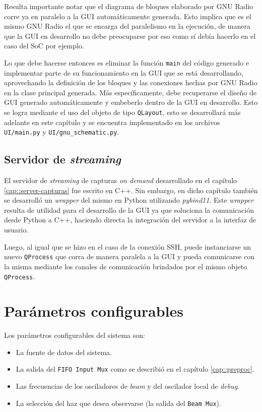 \documentclass[../../main.tex]{subfiles}
\begin{document}
Resulta importante notar que el diagrama de bloques elaborado por GNU Radio corre ya en paralelo a la GUI automáticamente generada. Esto implica que es el mismo GNU Radio el que se encarga del paralelismo en la ejecución, de manera que la GUI en desarrollo no debe preocuparse por eso como sí debía hacerlo en el caso del SoC por ejemplo.

Lo que debe hacerse entonces es eliminar la función \texttt{main} del código generado e implementar parte de su funcionamiento en la GUI que se está desarrollando, aprovechando la definición de los bloques y las conexiones hechas por GNU Radio en la clase principal generada. 
Más específicamente, debe recuperarse el diseño de GUI generado automáticamente y embeberlo dentro de la GUI en desarrollo. Esto se logra mediante el uso del objeto de tipo \texttt{QLayout}, esto se desarrollará más adelante en este capítulo y se encuentra implementado en los archivos \texttt{UI/main.py} y \texttt{UI/gnu\_schematic.py}.

\subsection{Servidor de \textit{streaming}}
El servidor de \textit{streaming} de capturas \textit{on demand} desarrollado en el capítulo \ref{cap::server-capturas} fue escrito en C++. Sin embargo, en dicho capítulo también se desarrolló un \textit{wrapper} del mismo en Python utilizando \textit{pybind11}\cite{pybind11}. Este \textit{wrapper} resulta de utilidad para el desarrollo de la GUI ya que soluciona la comunicación desde Python a C++, haciendo directa la integración del servidor a la interfaz de usuario.

Luego, al igual que se hizo en el caso de la conexión SSH, puede instanciarse un nuevo \texttt{QProcess} que corra de manera paralela a la GUI y pueda comunicarse con la misma mediante los canales de comunicación brindados por el mismo objeto \texttt{QProcess}.

\section{Parámetros configurables}\label{subsec::params-configurables}
Los parámetros configurables del sistema son:
\begin{itemize}
    \item La fuente de datos del sistema.
    \item La salida del \texttt{FIFO Input Mux} como se describió en el capítulo \ref{cap::preproc}.
    \item Las frecuencias de los osciladores de \textit{beam} y del oscilador local de \textit{debug}.
    \item La selección del haz que desea observarse (la salida del \texttt{Beam Mux}).
\end{itemize}
\end{document}
